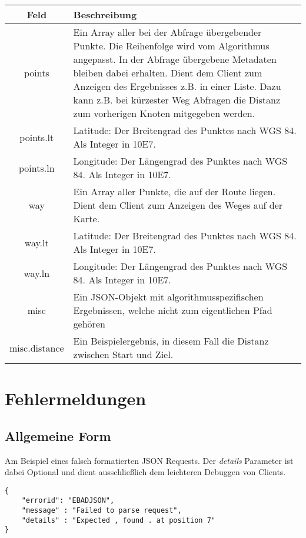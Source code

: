 \documentclass[ngerman,titlepage,parskip=true]{scrartcl}
\begin{document}
		\begin{tabular}{|c|p{12cm}|}
			\hline
			\textbf{Feld} & \textbf{Beschreibung} \\ 
			\hline \hline
			
			points & Ein Array aller bei der Abfrage übergebender Punkte. Die Reihenfolge wird vom Algorithmus angepasst. In der Abfrage übergebene Metadaten bleiben dabei erhalten. Dient dem Client zum Anzeigen des Ergebnisses z.B. in einer Liste. Dazu kann z.B. bei kürzester Weg Abfragen die Distanz zum vorherigen Knoten mitgegeben werden.\\
			\hline
			
	    	points.lt & Latitude: Der Breitengrad des Punktes nach WGS 84. Als Integer in 10E7.\\ 
	    	\hline
	    	
	    	points.ln & Longitude: Der Längengrad des Punktes nach WGS 84. Als Integer in 10E7.\\
	    	\hline
	    	
	    	way & Ein Array aller Punkte, die auf der Route liegen. Dient dem Client zum Anzeigen des Weges auf der Karte.\\
			\hline
			
	    	way.lt & Latitude: Der Breitengrad des Punktes nach WGS 84. Als Integer in 10E7.\\ 
	    	\hline
	    	
	    	way.ln & Longitude: Der Längengrad des Punktes nach WGS 84. Als Integer in 10E7.\\
	    	\hline
	    	
	    	misc & Ein JSON-Objekt mit algorithmusspezifischen Ergebnissen, welche nicht zum eigentlichen Pfad gehören \\
	    	\hline
	    	
	    	misc.distance & Ein Beispielergebnis, in diesem Fall die Distanz zwischen Start und Ziel.\\
	    	\hline
		\end{tabular}

\section{Fehlermeldungen}
\subsection{Allgemeine Form}
Am Beispiel eines falsch formatierten JSON Requests.
Der \textit{details} Parameter ist dabei Optional und dient ausschließlich dem leichteren Debuggen von 
Clients.
	\begin{lstlisting}
{
	"errorid": "EBADJSON",
	"message" : "Failed to parse request",
	"details" : "Expected , found . at position 7"
}
	\end{lstlisting}
\end{document}
